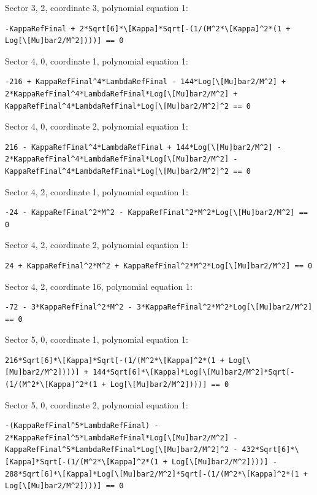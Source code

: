 \documentclass[11pt]{article}
\begin{document}
Sector {3, 2}, coordinate 3, polynomial equation 1:
\begin{verbatim}
-KappaRefFinal + 2*Sqrt[6]*\[Kappa]*Sqrt[-(1/(M^2*\[Kappa]^2*(1 + Log[\[Mu]bar2/M^2])))] == 0
\end{verbatim}

Sector {4, 0}, coordinate 1, polynomial equation 1:
\begin{verbatim}
-216 + KappaRefFinal^4*LambdaRefFinal - 144*Log[\[Mu]bar2/M^2] + 2*KappaRefFinal^4*LambdaRefFinal*Log[\[Mu]bar2/M^2] + KappaRefFinal^4*LambdaRefFinal*Log[\[Mu]bar2/M^2]^2 == 0
\end{verbatim}

Sector {4, 0}, coordinate 2, polynomial equation 1:
\begin{verbatim}
216 - KappaRefFinal^4*LambdaRefFinal + 144*Log[\[Mu]bar2/M^2] - 2*KappaRefFinal^4*LambdaRefFinal*Log[\[Mu]bar2/M^2] - KappaRefFinal^4*LambdaRefFinal*Log[\[Mu]bar2/M^2]^2 == 0
\end{verbatim}

Sector {4, 2}, coordinate 1, polynomial equation 1:
\begin{verbatim}
-24 - KappaRefFinal^2*M^2 - KappaRefFinal^2*M^2*Log[\[Mu]bar2/M^2] == 0
\end{verbatim}

Sector {4, 2}, coordinate 2, polynomial equation 1:
\begin{verbatim}
24 + KappaRefFinal^2*M^2 + KappaRefFinal^2*M^2*Log[\[Mu]bar2/M^2] == 0
\end{verbatim}

Sector {4, 2}, coordinate 16, polynomial equation 1:
\begin{verbatim}
-72 - 3*KappaRefFinal^2*M^2 - 3*KappaRefFinal^2*M^2*Log[\[Mu]bar2/M^2] == 0
\end{verbatim}

Sector {5, 0}, coordinate 1, polynomial equation 1:
\begin{verbatim}
216*Sqrt[6]*\[Kappa]*Sqrt[-(1/(M^2*\[Kappa]^2*(1 + Log[\[Mu]bar2/M^2])))] + 144*Sqrt[6]*\[Kappa]*Log[\[Mu]bar2/M^2]*Sqrt[-(1/(M^2*\[Kappa]^2*(1 + Log[\[Mu]bar2/M^2])))] == 0
\end{verbatim}

Sector {5, 0}, coordinate 2, polynomial equation 1:
\begin{verbatim}
-(KappaRefFinal^5*LambdaRefFinal) - 2*KappaRefFinal^5*LambdaRefFinal*Log[\[Mu]bar2/M^2] - KappaRefFinal^5*LambdaRefFinal*Log[\[Mu]bar2/M^2]^2 - 432*Sqrt[6]*\[Kappa]*Sqrt[-(1/(M^2*\[Kappa]^2*(1 + Log[\[Mu]bar2/M^2])))] - 288*Sqrt[6]*\[Kappa]*Log[\[Mu]bar2/M^2]*Sqrt[-(1/(M^2*\[Kappa]^2*(1 + Log[\[Mu]bar2/M^2])))] == 0
\end{verbatim}
\end{document}
